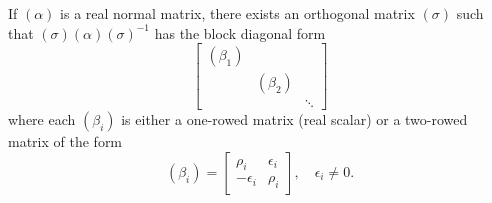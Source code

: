 If $(\alpha)$ is a real normal matrix, there exists an orthogonal matrix $(\sigma)$ such that $(\sigma)(\alpha)(\sigma)^{-1}$ has the block diagonal form
$$\begin{bmatrix}
(\beta_1) & & \\
& (\beta_2) & \\
& & \ddots
\end{bmatrix}$$
where each $(\beta_i)$ is either a one-rowed matrix (real scalar) or a two-rowed matrix of the form
$$(\beta_i) = \begin{bmatrix} \rho_i & \epsilon_i \\ -\epsilon_i & \rho_i \end{bmatrix}, \quad \epsilon_i \neq 0.$$
